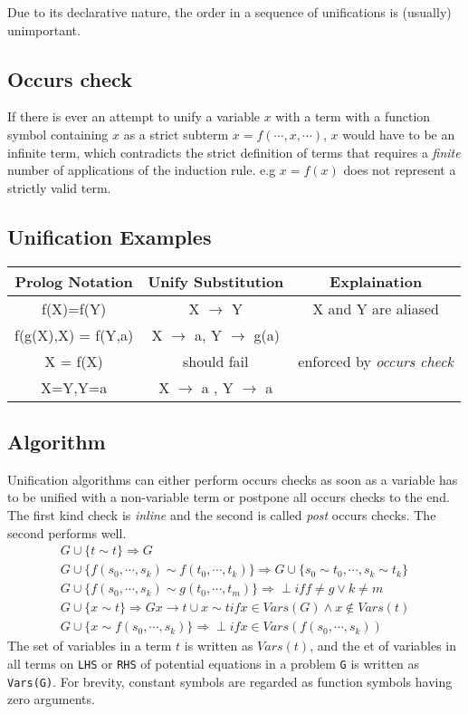 Due to its declarative nature, the order in a sequence of unifications
is (usually) unimportant.


\subsection{Occurs check}

If there is ever an attempt to unify a variable $x$ with a term with a
function symbol containing $x$ as a strict subterm $x=f(\cdots,
x,\cdots)$, $x$ would have to be an infinite term, which contradicts
the strict definition of terms that requires a \textit{finite} number
of applications of the induction rule. e.g $x=f(x)$ does not represent
a strictly valid term.

\subsection{Unification Examples}

\begin{tabular}{|c|c|c|}
\hline
Prolog Notation & Unify Substitution & Explaination \\
\hline 

f(X)=f(Y) & X $\rightarrow$ Y & X and Y are aliased \\
f(g(X),X) = f(Y,a) & X $\rightarrow$ a, Y $\rightarrow$ g(a) & \\
X = f(X) & should fail & enforced by \textit{occurs check} \\
X=Y,Y=a & X $\rightarrow$ a , Y $\rightarrow$ a & \\
\hline 
\end{tabular}

\subsection{Algorithm}
Unification algorithms can either perform occurs checks as soon as a
variable has to be unified with a non-variable term or postpone all
occurs checks to the end. The first kind check is \textit{inline} and
the second is called \textit{post} occurs checks. The second performs well.
\begin{eqnarray}
G \cup  \{t  \sim t\}  \Rightarrow G \\
G \cup \{ f(s_0, \cdots ,s_k )  \sim f(t_0, \cdots, t_k)\}  \Rightarrow
G \cup \{s_0 \sim t_0, \cdots, s_k \sim t_k \}\\
G \cup \{f(s_0, \cdots, s_k) \sim g(t_0,\cdots, t_m ) \} \Rightarrow
\perp if f \neq g \vee  k \neq m\\
G \cup \{ x \sim t \} \Rightarrow
G{x\rightarrow t} \cup {x \sim t} if x \in Vars(G) \wedge x \notin Vars(t) \\
G \cup \{ x \sim f(s_0, \cdots, s_k) \} \Rightarrow \perp if x \in
Vars(f(s_0, \cdots, s_k ) )
\end{eqnarray}
The set of variables in a term $t$ is written as $Vars(t)$, and the et
of variables in all terms on \verb|LHS| or \verb|RHS| of potential
equations in a problem \verb|G| is written as \verb|Vars(G)|. For
brevity, constant symbols are regarded as function symbols having zero
arguments.

